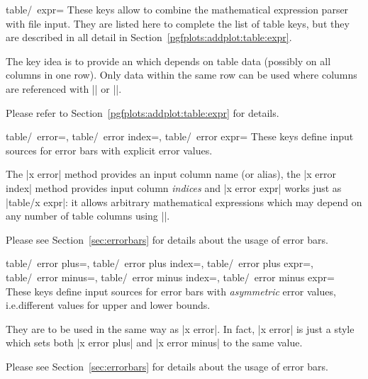 {\begin{pgfplotsxykeylist}{table/\x\ expr=}
    These keys allow to combine the mathematical expression parser with file
    input. They are listed here to complete the list of table keys, but they are
    described in all detail in Section~\ref{pgfplots:addplot:table:expr}.

    The key idea is to provide an  which depends on table data
    (possibly on all columns in one row). Only data within the same row can be
    used where columns are referenced with |\thisrow| or
    |\thisrowno|.

    Please refer to Section~\ref{pgfplots:addplot:table:expr} for details.
\end{pgfplotsxykeylist}

\begin{pgfplotsxykeylist}{%
    table/\x\ error=,
    table/\x\ error index=,
    table/\x\ error expr=%
}
    These keys define input sources for error bars with explicit error values.

    The |x error| method provides an input column name (or alias), the
    |x error index| method provides input column \emph{indices} and
    |x error expr| works just as |table/x expr|: it allows arbitrary
    mathematical expressions which may depend on any number of table columns
    using |\thisrow|.

    Please see Section~\ref{sec:errorbars} for details about the usage of error
    bars.
\end{pgfplotsxykeylist}

\begin{pgfplotsxykeylist}{%
    table/\x\ error plus=,
    table/\x\ error plus index=,
    table/\x\ error plus expr=,
    table/\x\ error minus=,
    table/\x\ error minus index=,
    table/\x\ error minus expr=%
}
    These keys define input sources for error bars with \emph{asymmetric} error
    values, i.e.\@ different values for upper and lower bounds.

    They are to be used in the same way as |x error|. In fact, |x error| is
    just a style which sets both |x error plus| and |x error minus| to the same
    value.

    Please see Section~\ref{sec:errorbars} for details about the usage of error
    bars.
\end{pgfplotsxykeylist}

}

